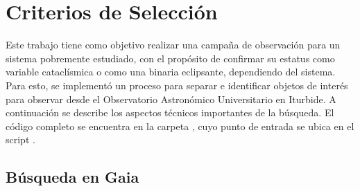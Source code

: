 \section{Criterios de Selección} \label{muestra:crit_seleccion}


Este trabajo tiene como objetivo realizar una campaña de observación para un
sistema pobremente estudiado, con el propósito de confirmar su estatus como
variable cataclísmica o como una binaria eclipsante, dependiendo del sistema.
Para esto, se implementó un proceso para separar e identificar objetos de
interés para observar desde el Observatorio Astronómico Universitario en
Iturbide. A continuación se describe los aspectos técnicos importantes de la
búsqueda. El código completo se encuentra en la carpeta
\href{https://github.com/KnightIV/UANL_MAPTA_Observaciones/tree/main/obsrv_plan}{},
cuyo punto de entrada se ubica en el script
\href{URLhttps://github.com/KnightIV/UANL_MAPTA_Observaciones/blob/main/obsrv_plan/main.py}{}.

\subsection{Búsqueda en Gaia}  \label{muestra:crit_seleccion:busqueda_fotometrica}

